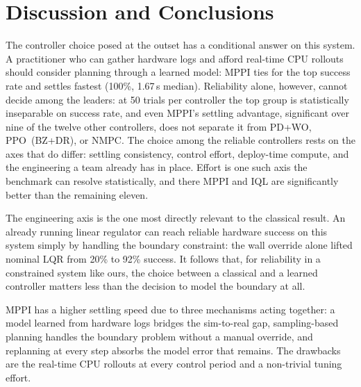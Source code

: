 \section{Discussion and Conclusions}
\label{sec:discussion}

The controller choice posed at the outset has a conditional answer on this system.
A practitioner who can gather hardware logs and afford real-time CPU rollouts should consider planning through a learned model: MPPI ties for the top success rate and settles fastest (100\%, 1.67\,s median).
Reliability alone, however, cannot decide among the leaders: at 50 trials per controller the top group is statistically inseparable on success rate, and even MPPI's settling advantage, significant over nine of the twelve other controllers, does not separate it from PD+WO, PPO~(BZ+DR), or NMPC.
The choice among the reliable controllers rests on the axes that do differ: settling consistency, control effort, deploy-time compute, and the engineering a team already has in place.
Effort is one such axis the benchmark can resolve statistically, and there MPPI and IQL are significantly better than the remaining eleven.

The engineering axis is the one most directly relevant to the classical result.
An already running linear regulator can reach reliable hardware success on this system simply by handling the boundary constraint: the wall override alone lifted nominal LQR from 20\% to 92\% success.
It follows that, for reliability in a constrained system like ours, the choice between a classical and a learned controller matters less than the decision to model the boundary at all.


MPPI has a higher settling speed due to three mechanisms acting together: a model learned from hardware logs bridges the sim-to-real gap, sampling-based planning handles the boundary problem without a manual override, and replanning at every step absorbs the model error that remains.
The drawbacks are the real-time CPU rollouts at every control period and a non-trivial tuning effort.

